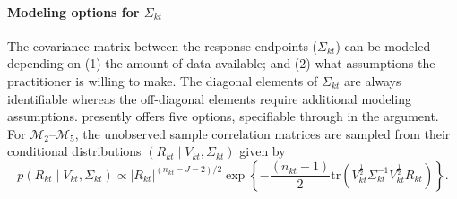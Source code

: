 \paragraph{Modeling options for $\Sigma_{kt}$} The covariance matrix between the response endpoints ($\Sigma_{kt}$) can be modeled depending on (1) the amount of data available; and (2) what assumptions the practitioner is willing to make. The diagonal elements of $\Sigma_{kt}$ are always identifiable whereas the off-diagonal elements require additional modeling assumptions.  presently offers five options, specifiable through  in the  argument. For $\mathcal{M}_2$--$\mathcal{M}_5$, the unobserved sample correlation matrices are sampled from their conditional distributions $(R_{kt}\mid V_{kt},\Sigma_{kt})$ given by
\begin{equation}\label{eq:sample-correlation-density}
  p(R_{kt}\mid V_{kt},\Sigma_{kt}) \propto |R_{kt}|^{(n_{kt}-J-2)/2} \exp\left\{-\dfrac{(n_{kt}-1)}{2}\mathrm{tr}\left(V_{kt}^{\frac{1}{2}}\Sigma_{kt}^{-1}V_{kt}^{\frac{1}{2}}R_{kt} \right) \right\}.
\end{equation}
